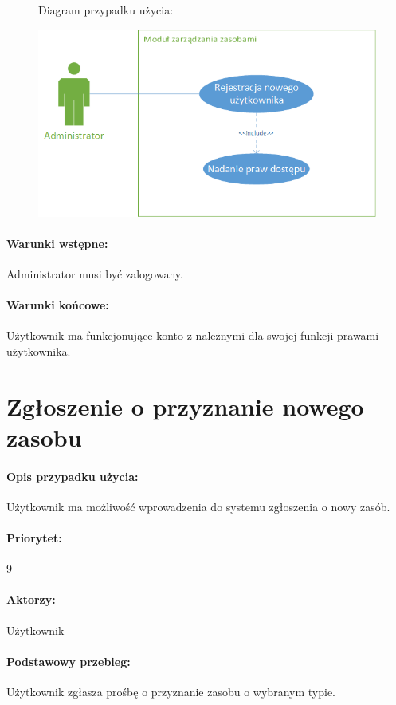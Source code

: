 \documentclass[11pt, a4paper, oneside]{report}
\begin{document}
\begin{figure}[H]
Diagram przypadku użycia:

\centering
\includegraphics[scale=1]{uzytkownik_rejestracja.png}
\end{figure}
\paragraph{Warunki wstępne:} Administrator musi być zalogowany.
\paragraph{Warunki końcowe:}
Użytkownik ma funkcjonujące konto z należnymi dla swojej funkcji prawami użytkownika.
\section{Zgłoszenie o przyznanie nowego zasobu} 
\paragraph{Opis przypadku użycia:}
Użytkownik ma możliwość wprowadzenia do systemu zgłoszenia o nowy zasób.
\paragraph{Priorytet:} 9
\paragraph{Aktorzy:} Użytkownik
\paragraph{Podstawowy przebieg:}
Użytkownik zgłasza prośbę o przyznanie zasobu o wybranym typie. 
\end{document}
